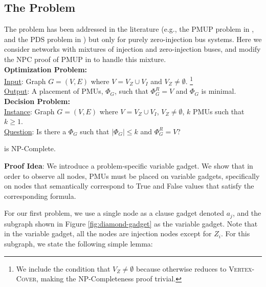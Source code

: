 \subsection{The \full Problem}
\label{subsec:full}

The \full problem has been addressed in the literature (e.g., the PMUP problem in \cite{Brueni05}, and the PDS problem in \cite{Haynes02}) but only for purely zero-injection bus systems. 
Here we consider networks with mixtures of injection and zero-injection buses, and modify the NPC proof of PMUP in \cite{Brueni05} to handle this mixture.
\\
{\bf \full Optimization Problem:}\\
\indent \underline{Input}: Graph $G=(V,E)$ where $V=V_Z \cup V_I$ and $V_Z \neq \emptyset$.
	{\footnote {\small We include the condition that $V_Z \neq \emptyset$ because otherwise \full reduces to \textsc{Vertex-Cover}, making the NP-Completeness
	proof trivial.}} \\
\indent \underline{Output}: A placement of PMUs, $\Phi_G$, such that $\Phi^R_G=V$ and $\Phi_G$ is minimal.
\\
{\bf \full Decision Problem:} \\
\indent \underline{Instance}: Graph $G=(V,E)$ where $V=V_Z \cup V_I$, $V_Z \neq \emptyset$, $k$ PMUs such that $k \geq 1$. \\
\indent \underline{Question}: Is there a $\Phi_G$ such that $|\Phi_G| \leq k$ and $\Phi^R_G = V$?


\begin{theorem}
\full is NP-Complete. %
\label{thm:npc-full}
\end{theorem}

{\bf Proof Idea}:  We introduce a problem-specific variable gadget. We show that in order to observe all nodes, PMUs must be placed on variable gadgets, specifically on
nodes that semantically correspond to True and False values that satisfy the corresponding \sat formula. 

For our first problem, we use a single node as a clause gadget denoted $a_j$, and the subgraph shown in Figure \ref{fig:diamond-gadget} as the variable gadget. Note that in the variable gadget, all the nodes are injection nodes except for $Z_i$. For this subgraph, we state the following simple lemma:

